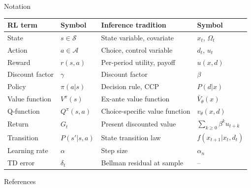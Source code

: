 \begin{frame}[shrink=10]{Notation}
\begin{center}
\small
\begin{tabular}{llll}
\toprule
RL term & Symbol & Inference tradition & Symbol \\
\midrule
State & $s \in \mathcal{S}$ & State variable, covariate & $x_t$, $\Omega_t$ \\
Action & $a \in \mathcal{A}$ & Choice, control variable & $d_t$, $u_t$ \\
Reward & $r(s,a)$ & Per-period utility, payoff & $u(x,d)$ \\
Discount factor & $\gamma$ & Discount factor & $\beta$ \\
Policy & $\pi(a|s)$ & Decision rule, CCP & $P(d|x)$ \\
Value function & $V^\pi(s)$ & Ex-ante value function & $\bar{V}_\theta(x)$ \\
Q-function & $Q^\pi(s,a)$ & Choice-specific value function & $v_\theta(x,d)$ \\
Return & $G_t$ & Present discounted value & $\sum_{k\ge0} \beta^k u_{t+k}$ \\
Transition & $P(s'|s,a)$ & State transition law & $f(x_{t+1} | x_t, d_t)$ \\
Learning rate & $\alpha$ & Step size & $\alpha_n$ \\
TD error & $\delta_t$ & Bellman residual at sample & -- \\
\bottomrule
\end{tabular}
\end{center}

\end{frame}

\begin{frame}[allowframebreaks]{References}
\scriptsize


\end{frame}


